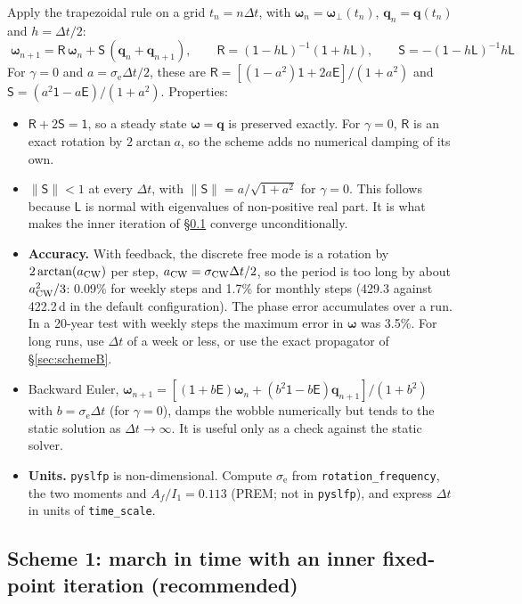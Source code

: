 \documentclass[11pt,a4paper]{article}
\newcommand{\bw}{\bm{\omega}}
\newcommand{\bq}{\mathbf{q}}
\newcommand{\E}{\mathsf{E}}
\newcommand{\Id}{\mathsf{1}}
\newcommand{\R}{\mathsf{R}}
\newcommand{\Sm}{\mathsf{S}}
\newcommand{\se}{\sigma_{\mathrm e}}
\newcommand{\scw}{\sigma_{\mathrm{CW}}}
\begin{document}
Apply the trapezoidal rule on a grid $t_n=n\Delta t$, with $\bw_n=\bw_\perp(t_n)$, $\bq_n=\bq(t_n)$ and
$h=\Delta t/2$:
\begin{equation}
  \boxed{\;\bw_{n+1}=\R\,\bw_n+\Sm\,(\bq_n+\bq_{n+1}),\qquad
  \R=(\Id-h\mathsf{L})^{-1}(\Id+h\mathsf{L}),\qquad \Sm=-(\Id-h\mathsf{L})^{-1}h\mathsf{L}\;}
  \label{eq:step}
\end{equation}
For $\gamma=0$ and $a=\se\Delta t/2$, these are
$\R=[(1-a^2)\Id+2a\E]/(1+a^2)$ and $\Sm=(a^2\Id-a\E)/(1+a^2)$.
Properties:
\begin{itemize}
  \item $\R+2\Sm=\Id$, so a steady state $\bw=\bq$ is preserved exactly. For $\gamma=0$, $\R$ is an
  exact rotation by $2\arctan a$, so the scheme adds no numerical damping of its own.
  \item $\|\Sm\|<1$ at every $\Delta t$, with $\|\Sm\|=a/\sqrt{1+a^2}$ for $\gamma=0$. This follows
  because $\mathsf{L}$ is normal with eigenvalues of non-positive real part. It is what makes the
  inner iteration of \S\ref{sec:schemeA} converge unconditionally.
  \item \textbf{Accuracy.} With feedback, the discrete free mode is a rotation by
  $2\arctan(a_{\rm CW})$ per step, $a_{\rm CW}=\scw\Delta t/2$, so the period is too long by about
  $a_{\rm CW}^2/3$: 0.09\% for weekly steps and 1.7\% for monthly steps (429.3 against 422.2\,d in the default configuration). The
  phase error accumulates over a run. In a 20-year test with weekly steps the maximum error in
  $\bw$ was 3.5\%. For long runs, use $\Delta t$ of a week or less, or use the exact propagator of
  \S\ref{sec:schemeB}.
  \item Backward Euler, $\bw_{n+1}=[(\Id+b\E)\bw_n+(b^2\Id-b\E)\bq_{n+1}]/(1+b^2)$ with
  $b=\se\Delta t$ (for $\gamma=0$), damps the wobble numerically but tends to the static solution
  as $\Delta t\to\infty$. It is useful only as a check against the static solver.
  \item \textbf{Units.} \texttt{pyslfp} is non-dimensional. Compute $\se$ from
  \texttt{rotation\_frequency}, the two moments and $A_f/I_1=0.113$ (PREM; not in \texttt{pyslfp}), and express $\Delta t$ in units of
  \texttt{time\_scale}.
\end{itemize}

\subsection{Scheme 1: march in time with an inner fixed-point iteration (recommended)}
\label{sec:schemeA}
\end{document}
